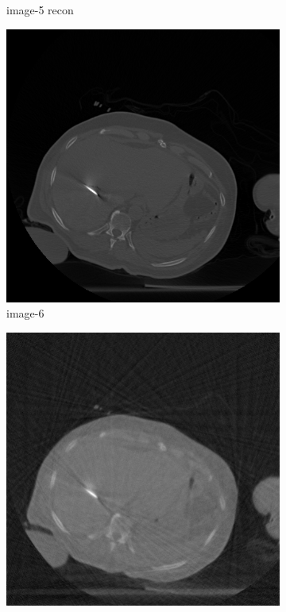 \documentclass[journal]{IEEEtran}
\begin{document}
\begin{figure}[!h]
\begin{subfigure}[b]{0.24\linewidth}
\captionsetup{labelformat=empty}       
 \caption{image-5 recon}
    \end{subfigure}
 \begin{subfigure}[b]{0.24\linewidth}
        \includegraphics[width=\textwidth]{../images/tmh/RFA2/template6.png}
\captionsetup{labelformat=empty}       
 \caption{image-6}
    \end{subfigure}
       \begin{subfigure}[b]{0.24\linewidth}
        \includegraphics[width=\textwidth]{../images/tmh/RFA2/new_protocol/result_image_6.png}

\end{subfigure}
\end{figure}
\end{document}
